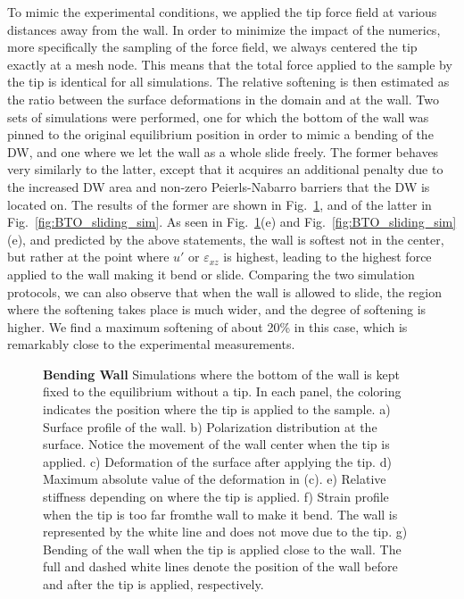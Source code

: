 To mimic the experimental conditions, we applied the tip force field at various distances away from the wall.
In order to minimize the impact of the numerics, more specifically the sampling of the force field, we always centered the tip exactly at a mesh node.
This means that the total force applied to the sample by the tip is identical for all simulations.
The relative softening is then estimated as the ratio between the surface deformations in the domain and at the wall.
Two sets of simulations were performed, one for which the bottom of the wall was pinned to the original equilibrium position in order to mimic a bending of the DW, and one where we let the wall as a whole slide freely.
The former behaves very similarly to the latter, except that it acquires an additional penalty due to the increased DW area and non-zero Peierls-Nabarro barriers that the DW is located on.
The results of the former are shown in Fig.~\ref{fig:BTO_bending_sim}, and of the latter in Fig.~\ref{fig:BTO_sliding_sim}.
As seen in Fig.~\ref{fig:BTO_bending_sim}(e) and Fig.~\ref{fig:BTO_sliding_sim}(e), and predicted by the above statements, the wall is softest not in the center, but rather at the point where $u'$ or $\varepsilon_{xz}$ is highest, leading to the highest force applied to the wall making it bend or slide.
Comparing the two simulation protocols, we can also observe that when the wall is allowed to slide, the region where the softening takes place is much wider, and the degree of softening is higher.
We find a maximum softening of about 20\% in this case, which is remarkably close to the experimental measurements.
\begin{figure}
	\caption{\label{fig:BTO_bending_sim}{\bf Bending Wall} Simulations where the bottom of the wall is kept fixed to the equilibrium without a tip. In each panel, the coloring indicates the position where the tip is applied to the sample. a) Surface profile of the wall. b) Polarization distribution at the surface. Notice the movement of the wall center when the tip is applied. c) Deformation of the surface after applying the tip. d) Maximum absolute value of the deformation in (c). e) Relative stiffness depending on where the tip is applied. f) Strain profile when the tip is too far fromthe  wall to make it bend. The wall is represented by the white line and does not move due to the tip. g) Bending of the wall when the tip is applied close to the wall. The full and dashed white lines denote the position of the wall before and after the tip is applied, respectively.}
\end{figure}

